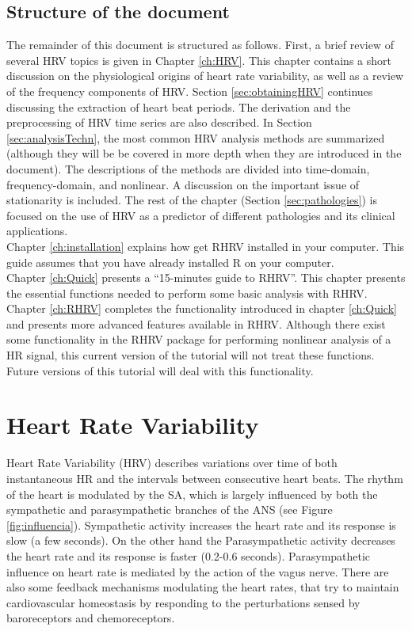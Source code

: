 \documentclass[12pt,lot, lof]{puthesis}
\begin{document}
\section{Structure of the document} The remainder of this document is 
structured as follows. First, a brief review of several \gls{HRV} topics is 
given in Chapter \ref{ch:HRV}. This chapter contains a short discussion on the 
physiological origins of heart rate variability, as well as a review of the 
frequency
components of \gls{HRV}. Section \ref{sec:obtainingHRV} continues discussing 
the extraction of heart beat periods. The derivation and the preprocessing of 
\gls{HRV} time series are also described.  In Section \ref{sec:analysisTechn}, 
the most common \gls{HRV} analysis methods are summarized (although they will 
be be covered in more depth when they are introduced in the document). The 
descriptions
of the methods are divided into time-domain, frequency-domain, and nonlinear. A 
discussion on the important issue of stationarity is included. The rest of the 
chapter (Section \ref{sec:pathologies}) is focused on the use of \gls{HRV} as a 
predictor of different pathologies and its clinical applications.\\

Chapter \ref{ch:installation} explains how get RHRV installed in your computer. 
This guide assumes that you have already installed R on your computer.\\

Chapter \ref{ch:Quick} presents a ``15-minutes guide to RHRV''. This chapter 
presents the essential functions needed to perform some basic analysis with 
RHRV. Chapter \ref{ch:RHRV} completes the functionality introduced in chapter 
\ref{ch:Quick} and presents more advanced features available in RHRV. Although 
there exist some functionality in the RHRV package for performing nonlinear 
analysis of a \gls{HR} signal, this current version of the tutorial will not 
treat these functions. Future versions of this tutorial will deal with this 
functionality.
\chapter{Heart Rate Variability\label{ch:HRV}}

Heart Rate Variability (\gls{HRV}) describes variations over time of both 
instantaneous \gls{HR} and  the intervals between consecutive heart beats.
The rhythm of the heart is modulated by the \gls{SA}, which is largely 
influenced by both
the sympathetic and parasympathetic branches of
the \gls{ANS} (see Figure \ref{fig:influencia}). Sympathetic activity increases 
the heart rate and its response is slow (a few seconds). On the other
hand the Parasympathetic activity decreases the heart rate and its response is 
faster (0.2-0.6 seconds). Parasympathetic influence
on heart rate is mediated by the action of the vagus nerve. 
There are also some feedback mechanisms modulating the heart rates, that try to 
maintain cardiovascular
homeostasis by responding to the perturbations sensed by baroreceptors and 
chemoreceptors.\\
\end{document}
